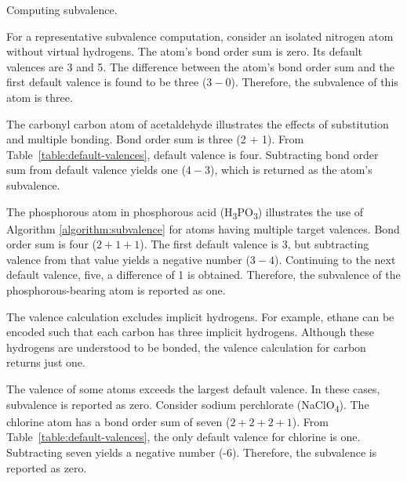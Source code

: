 \documentclass{article}
\begin{document}
\begin{algorithm}
    \caption{Computing subvalence.}
    \label{algorithm:subvalence}
    
\end{algorithm}

For a representative subvalence computation, consider an isolated nitrogen atom without virtual hydrogens. The atom's bond order sum is zero. Its default valences are 3 and 5. The difference between the atom's bond order sum and the first default valence is found to be three ($3 - 0$). Therefore, the subvalence of this atom is three.

The carbonyl carbon atom of acetaldehyde illustrates the effects of substitution and multiple bonding. Bond order sum is three (2 + 1). From Table~\ref{table:default-valences}, default valence is four. Subtracting bond order sum from default valence yields one ($4 - 3$), which is returned as the atom's subvalence.

The phosphorous atom in phosphorous acid (H\textsubscript{3}PO\textsubscript{3}) illustrates the use of Algorithm \ref{algorithm:subvalence} for atoms having multiple target valences. Bond order sum is four ($2 + 1 + 1$). The first default valence is 3, but subtracting valence from that value yields a negative number ($3 - 4$). Continuing to the next default valence, five, a difference of 1 is obtained. Therefore, the subvalence of the phosphorous-bearing atom is reported as one.

The valence calculation excludes implicit hydrogens. For example, ethane can be encoded such that each carbon has three implicit hydrogens. Although these hydrogens are understood to be bonded, the valence calculation for carbon returns just one.

The valence of some atoms exceeds the largest default valence. In these cases, subvalence is reported as zero. Consider sodium perchlorate (NaClO\textsubscript{4}). The chlorine atom has a bond order sum of seven ($2 + 2 + 2 + 1$). From Table~\ref{table:default-valences}, the only default valence for chlorine is one. Subtracting seven yields a negative number (-6). Therefore, the subvalence is reported as zero.
\end{document}
